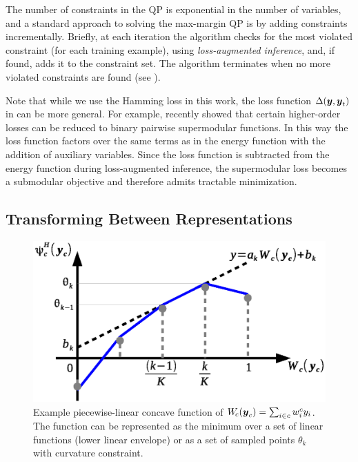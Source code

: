 \documentclass[10pt,journal,letterpaper,compsoc]{IEEEtran}
\begin{document}
The number of constraints in the QP is exponential in the number of
variables, and a standard approach to solving the max-margin QP is by
adding constraints incrementally. Briefly, at each iteration the
algorithm checks for the most violated constraint (for each training
example), using \emph{loss-augmented inference}, and, if found, adds
it to the constraint set. The algorithm terminates when no more
violated constraints are found (see ).

Note that while we use the Hamming loss in this work, the loss
function $\Delta({\boldsymbol{y}}, {\boldsymbol{y}}_t)$ in  can be more
general. For example, \citet{Pletscher:AISTATS12} recently showed that
certain higher-order losses can be reduced to binary pairwise
supermodular functions. In this way the loss function factors over the
same terms as in the energy function with the addition of auxiliary
variables. Since the loss function is subtracted from the energy
function during loss-augmented inference, the supermodular loss
becomes a submodular objective and therefore admits tractable
minimization.

\subsection{Transforming Between Representations}
\label{sec:representation_transformation}

\begin{figure}[t]
  \centering
  \includegraphics[width=0.9\columnwidth]{figures/concave}
  \caption{\label{fig:concave} Example piecewise-linear concave
    function of $W_{\!c}({\boldsymbol{y}}_c) = \sum_{i \in c} w^c_i y_i$. The
    function can be represented as the minimum over a set of linear
    functions (lower linear envelope) or as a set of sampled points
    $\theta_k$ with curvature constraint.}
\end{figure}
\end{document}
